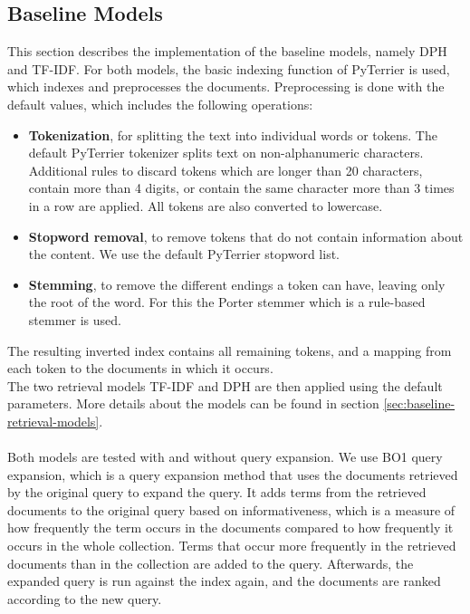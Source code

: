 \subsection{Baseline Models}
This section describes the implementation of the baseline models, namely DPH and TF-IDF.
For both models, the basic indexing function of PyTerrier is used, which indexes and preprocesses the documents.
Preprocessing is done with the default values, which includes the following operations:
\begin{itemize}
    \item{\textbf{Tokenization}, for splitting the text into individual words or tokens. The default PyTerrier tokenizer splits text on non-alphanumeric characters. Additional rules to discard tokens which are longer than 20 characters, contain more than 4 digits, or contain the same character more than 3 times in a row are applied. All tokens are also converted to lowercase.}
    \item \textbf{Stopword removal}, to remove tokens that do not contain information about the content. We use the default PyTerrier stopword list.
    \item \textbf{Stemming}, to remove the different endings a token can have, leaving only the root of the word. For this the Porter stemmer which is a rule-based stemmer is used.
\end{itemize}
The resulting inverted index contains all remaining tokens, and a mapping from each token to the documents in which it occurs.
\\
The two retrieval models TF-IDF and DPH are then applied using the default parameters.
More details about the models can be found in section \ref{sec:baseline-retrieval-models}.
\\
\\
Both models are tested with and without query expansion.
We use BO1 query expansion, which is a query expansion method that uses the documents retrieved by the original query to expand the query.
It adds terms from the retrieved documents to the original query based on informativeness, which is a measure of how frequently the term occurs in the documents compared to how frequently it occurs in the whole collection.
Terms that occur more frequently in the retrieved documents than in the collection are added to the query.
Afterwards, the expanded query is run against the index again, and the documents are ranked according to the new query.
\\
\\
